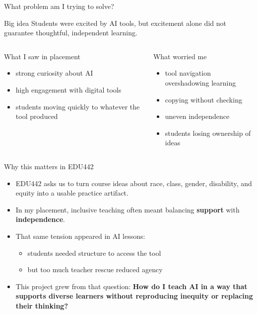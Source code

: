 \documentclass[aspectratio=169,11pt]{beamer}
\newcommand{\bigidea}[1]{
  \begin{block}{Big idea}
  \Large #1
  \end{block}
}
\begin{document}
\begin{frame}{What problem am I trying to solve?}
\bigidea{Students were excited by AI tools, but excitement alone did not guarantee thoughtful, independent learning.}

\vspace{0.2cm}
\begin{columns}[T]
  \begin{block}{What I saw in placement}
  \begin{itemize}
    \item strong curiosity about AI
    \item high engagement with digital tools
    \item students moving quickly to whatever the tool produced
  \end{itemize}
  \end{block}

  \begin{block}{What worried me}
  \begin{itemize}
    \item tool navigation overshadowing learning
    \item copying without checking
    \item uneven independence
    \item students losing ownership of ideas
  \end{itemize}
  \end{block}
\end{columns}
\end{frame}

\begin{frame}{Why this matters in EDU442}
\begin{itemize}
  \item EDU442 asks us to turn course ideas about race, class, gender, disability, and equity into a usable practice artifact.
  \item In my placement, inclusive teaching often meant balancing \textbf{support} with \textbf{independence}.
  \item That same tension appeared in AI lessons:
  \begin{itemize}
    \item students needed structure to access the tool
    \item but too much teacher rescue reduced agency
  \end{itemize}
  \item This project grew from that question: \textbf{How do I teach AI in a way that supports diverse learners without reproducing inequity or replacing their thinking?}
\end{itemize}
\end{frame}
\end{document}
